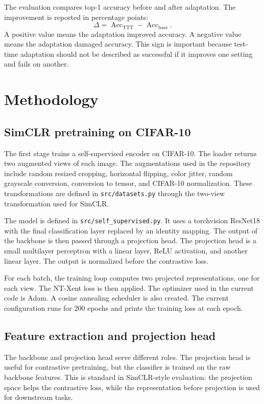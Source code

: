 \documentclass[a4paper,11pt]{article}
\begin{document}
The evaluation compares top-1 accuracy before and after adaptation. The improvement is reported in percentage points:
\[
\Delta=\operatorname{Acc}_{\text{TTT}}-\operatorname{Acc}_{\text{base}}.
\]
A positive value means the adaptation improved accuracy. A negative value means the adaptation damaged accuracy. This sign is important because test-time adaptation should not be described as successful if it improves one setting and fails on another.


\section{Methodology}

\subsection{SimCLR pretraining on CIFAR-10}

The first stage trains a self-supervised encoder on CIFAR-10. The loader returns two augmented views of each image. The augmentations used in the repository include random resized cropping, horizontal flipping, color jitter, random grayscale conversion, conversion to tensor, and CIFAR-10 normalization. These transformations are defined in \texttt{src/datasets.py} through the two-view transformation used for SimCLR.

The model is defined in \texttt{src/self\_supervised.py}. It uses a torchvision ResNet18 with the final classification layer replaced by an identity mapping. The output of the backbone is then passed through a projection head. The projection head is a small multilayer perceptron with a linear layer, ReLU activation, and another linear layer. The output is normalized before the contrastive loss.

For each batch, the training loop computes two projected representations, one for each view. The NT-Xent loss is then applied. The optimizer used in the current code is Adam. A cosine annealing scheduler is also created. The current configuration runs for 200 epochs and prints the training loss at each epoch.

\subsection{Feature extraction and projection head}

The backbone and projection head serve different roles. The projection head is useful for contrastive pretraining, but the classifier is trained on the raw backbone features. This is standard in SimCLR-style evaluation: the projection space helps the contrastive loss, while the representation before projection is used for downstream tasks.
\end{document}
